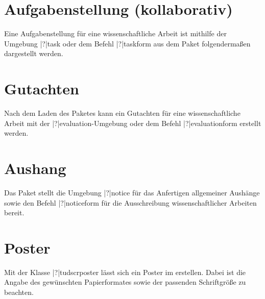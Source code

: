 \begin{Entity}{}
\section{%
  Aufgabenstellung (kollaborativ)%
  \label{sec:exmpl:task}%
}

Eine Aufgabenstellung für eine wissenschaftliche Arbeit ist mithilfe der 
Umgebung \Environment|?|{task} oder dem Befehl \Macro|?|{taskform} aus dem 
Paket  folgendermaßen dargestellt werden.



\section{%
  Gutachten%
  \label{sec:exmpl:evaluation}%
}

Nach dem Laden des Paketes  kann ein Gutachten für 
eine wissenschaftliche Arbeit mit der \Environment|?|{evaluation}-Umgebung 
oder dem Befehl \Macro|?|{evaluationform} erstellt werden.



\section{%
  Aushang%
  \label{sec:exmpl:notice}%
}

Das Paket  stellt die Umgebung \Environment|?|{notice}
für das Anfertigen allgemeiner Aushänge sowie den Befehl \Macro|?|{noticeform}
für die Ausschreibung wissenschaftlicher Arbeiten bereit.
\end{Entity}



\section{%
  Poster%
  \label{sec:exmpl:poster}%
}

Mit der Klasse \Class|?|{tudscrposter} lässt sich ein Poster im \TUDCD 
erstellen. Dabei ist die Angabe des gewünschten Papierformates sowie der 
passenden Schriftgröße zu beachten.
%




